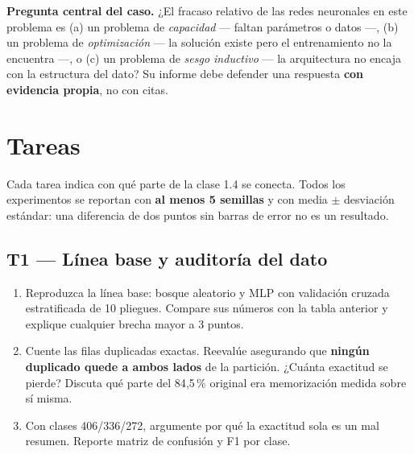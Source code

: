 \documentclass[11pt, a4paper]{article}
\newcommand{\enlace}[1]{\par\vspace{2pt}{\footnotesize\color{StanfordGray}%
	$\hookrightarrow$\  #1}}
\begin{document}
\begin{pregunta}
\textbf{Pregunta central del caso.} ¿El fracaso relativo de las redes neuronales en este problema es (a) un problema de \emph{capacidad} --- faltan par\'ametros o datos ---, (b) un problema de \emph{optimizaci\'on} --- la soluci\'on existe pero el entrenamiento no la encuentra ---, o (c) un problema de \emph{sesgo inductivo} --- la arquitectura no encaja con la estructura del dato? Su informe debe defender una respuesta \textbf{con evidencia propia}, no con citas.
\end{pregunta}

\section{Tareas}

Cada tarea indica con qu\'e parte de la clase 1.4 se conecta. Todos los experimentos se reportan con \textbf{al menos 5 semillas} y con media $\pm$ desviaci\'on est\'andar: una diferencia de dos puntos sin barras de error no es un resultado.

\subsection*{T1 --- Línea base y auditoría del dato}
\begin{enumerate}
	\item Reproduzca la l\'inea base: bosque aleatorio y MLP con validaci\'on cruzada estratificada de 10 pliegues. Compare sus n\'umeros con la tabla anterior y explique cualquier brecha mayor a 3 puntos.
	\item Cuente las filas duplicadas exactas. Reeval\'ue asegurando que \textbf{ning\'un duplicado quede a ambos lados} de la partici\'on. ¿Cu\'anta exactitud se pierde? Discuta qu\'e parte del 84{,}5\,\% original era memorizaci\'on medida sobre s\'i misma.
	\item Con clases 406/336/272, argumente por qu\'e la exactitud sola es un mal resumen. Reporte matriz de confusi\'on y F1 por clase.
\end{enumerate}
\end{document}
